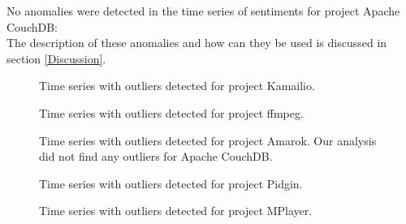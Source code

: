 \documentclass[12pt]{report}
\begin{document}
%
%

No anomalies were detected in the time series of sentiments for project Apache CouchDB: \\

The description of these anomalies and how can they be used is discussed in section \ref{Discussion}.

\begin{figure}
\centering
{}
\caption{Time series with outliers detected for project Kamailio.}
\label{figureOutliers_1}
\end{figure}


\begin{figure}
\centering
{}
\caption{Time series with outliers detected for project ffmpeg.}
\label{figureOutliers_2}
\end{figure}

\begin{figure}
\centering
{}
\caption{Time series with outliers detected for project Amarok. Our analysis did not find any outliers for Apache CouchDB.}
\label{figureOutliers_3}
\end{figure}

\begin{figure}
\centering
{}
\caption{Time series with outliers detected for project Pidgin.}
\label{figureOutliers_5}
\end{figure}

\begin{figure}
\centering
{}
\caption{Time series with outliers detected for project MPlayer.}
\label{figureOutliers_6}
\end{figure}
\end{document}
